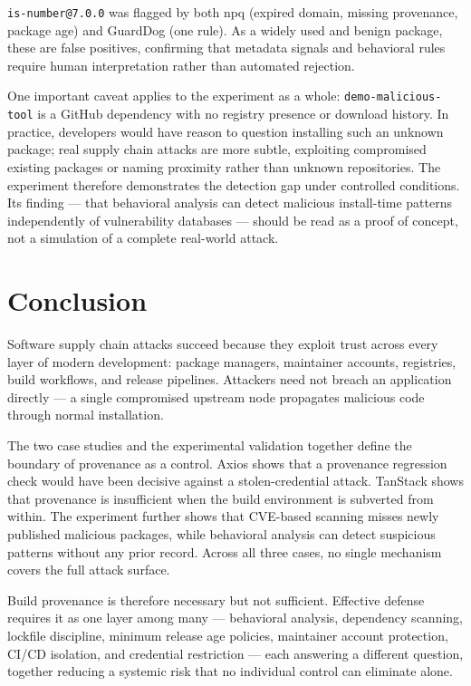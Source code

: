\documentclass[12pt,a4paper]{article}
\begin{document}
\texttt{is-number@7.0.0} was flagged by both npq (expired domain, missing provenance, package age) and GuardDog (one rule). As a widely used and benign package, these are false positives, confirming that metadata signals and behavioral rules require human interpretation rather than automated rejection.

One important caveat applies to the experiment as a whole: \texttt{demo-malicious-tool} is a GitHub dependency with no registry presence or download history. In practice, developers would have reason to question installing such an unknown package; real supply chain attacks are more subtle, exploiting compromised existing packages or naming proximity rather than unknown repositories. The experiment therefore demonstrates the detection gap under controlled conditions. Its finding --- that behavioral analysis can detect malicious install-time patterns independently of vulnerability databases --- should be read as a proof of concept, not a simulation of a complete real-world attack.

\section{Conclusion}

Software supply chain attacks succeed because they exploit trust across every layer of modern development: package managers, maintainer accounts, registries, build workflows, and release pipelines. Attackers need not breach an application directly --- a single compromised upstream node propagates malicious code through normal installation.

The two case studies and the experimental validation together define the boundary of provenance as a control. Axios shows that a provenance regression check would have been decisive against a stolen-credential attack. TanStack shows that provenance is insufficient when the build environment is subverted from within. The experiment further shows that CVE-based scanning misses newly published malicious packages, while behavioral analysis can detect suspicious patterns without any prior record. Across all three cases, no single mechanism covers the full attack surface.

Build provenance is therefore necessary but not sufficient. Effective defense requires it as one layer among many --- behavioral analysis, dependency scanning, lockfile discipline, minimum release age policies, maintainer account protection, CI/CD isolation, and credential restriction --- each answering a different question, together reducing a systemic risk that no individual control can eliminate alone.
\end{document}

